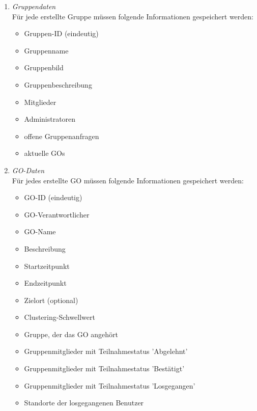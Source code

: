 \documentclass[parskip=full]{scrartcl}
\def\threedigits#1{%
  \ifnum#1<100 0\fi
  \ifnum#1<10 0\fi
  \number#1}
\begin{document}
\begin{enumerate}[label={\textbf{/D\protect\threedigits{\theenumi}0/}}, leftmargin=*]
	\item \textit{Gruppendaten} \\Für jede erstellte Gruppe müssen folgende Informationen gespeichert werden:
	\begin{itemize}
		\item Gruppen-ID (eindeutig)
		\item Gruppenname
		\item \colorbox{shadecolor}{Gruppenbild}
		\item \colorbox{shadecolor}{Gruppenbeschreibung}
		\item Mitglieder
		\item Administratoren
		\item offene Gruppenanfragen %
		\item aktuelle GOs
	\end{itemize}
	\item \textit{GO-Daten} \label{GO-Daten}\\
	Für jedes erstellte GO müssen folgende Informationen gespeichert werden:
	\begin{itemize}
		\item GO-ID (eindeutig)
		\item GO-Verantwortlicher
		\item GO-Name
		\item \colorbox{shadecolor}{Beschreibung}
		\item Startzeitpunkt
		\item Endzeitpunkt
		\item Zielort (optional)
		\item \colorbox{shadecolor}{Clustering-Schwellwert}
		\item Gruppe, der das GO angehört
		\item Gruppenmitglieder mit Teilnahmestatus 'Abgelehnt'
		\item Gruppenmitglieder mit Teilnahmestatus 'Bestätigt'
		\item Gruppenmitglieder mit Teilnahmestatus 'Losgegangen'
		\item Standorte der losgegangenen Benutzer
	\end{itemize}
\end{enumerate}

\newpage
\end{document}
